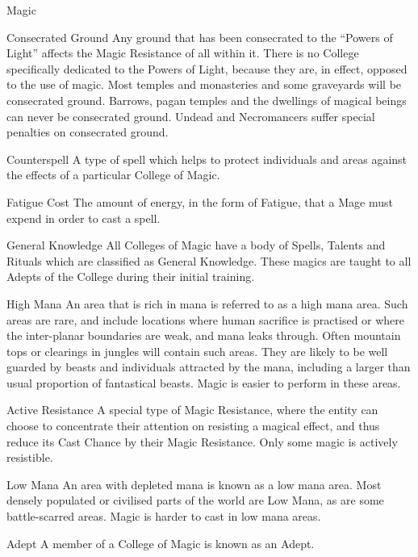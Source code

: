 \begin{Chapter}{Magic}
\begin{Description}
\item[Consecrated Ground] Any ground that has been consecrated to the
  “Powers of Light” affects the Magic Resistance of all within
  it. There is no College specifically dedicated to the Powers of
  Light, because they are, in effect, opposed to the use of magic.
  Most temples and monasteries and some graveyards will be consecrated
  ground.  Barrows, pagan temples and the dwellings of magical beings
  can never be consecrated ground.  Undead and Necromancers suffer
  special penalties on consecrated ground.

\item[Counterspell] A type of spell which helps to protect individuals
  and areas against the effects of a particular College of Magic.

\item[Fatigue Cost] The amount of energy, in the form of Fatigue, that
  a Mage must expend in order to cast a spell.

\item[General Knowledge] All Colleges of Magic have a body of Spells,
  Talents and Rituals which are classified as General Knowledge.
  These magics are taught to all Adepts of the College during their
  initial training.

\item[High Mana] An area that is rich in mana is referred to as a high
  mana area.  Such areas are rare, and include locations where human
  sacrifice is practised or where the inter-planar boundaries are
  weak, and mana leaks through.  Often mountain tops or clearings in
  jungles will contain such areas.  They are likely to be well guarded
  by beasts and individuals attracted by the mana, including a larger
  than usual proportion of fantastical beasts.  Magic is easier to
  perform in these areas.

\item[Active Resistance] A special type of Magic Resistance, where the
  entity can choose to concentrate their attention on resisting a
  magical effect, and thus reduce its Cast Chance by their Magic
  Resistance. Only some magic is actively resistible.

\item[Low Mana] An area with depleted mana is known as a low mana
  area.  Most densely populated or civilised parts of the world are
  Low Mana, as are some battle-scarred areas.  Magic is harder to cast
  in low mana areas.

\item[Adept] A member of a College of Magic is known as an Adept.


\end{Description}
\end{Chapter}
